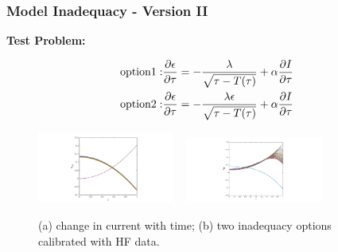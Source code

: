\documentclass[10pt,xcolor=dvipsnames,compress]{beamer}
\begin{document}
\begin{frame}
\frametitle{Model Inadequacy - Version II}
\vfill

\textbf{Test Problem:}

\begin{eqnarray*}
{\rm option 1:} & \frac{\partial\epsilon}{\partial\tau} = -\frac{\lambda}{\sqrt{\tau - {T}(\tau)}} + \alpha \frac{\partial I}{\partial\tau}\\
{\rm option 2:} & \frac{\partial\epsilon}{\partial\tau} = -\frac{\lambda\epsilon}{\sqrt{\tau - {T}(\tau)}} + \alpha \frac{\partial I}{\partial\tau}
\end{eqnarray*}

\begin{figure}[h]
    \centering
    \includegraphics[trim = 9.6in 0.2in 9.6in 0.2in, clip, width=0.4\textwidth]{figs/eta_LF.png} 
    ~
    \includegraphics[trim = 7in 0.2in 7in 0.2in, clip, width=0.4\textwidth]{figs/eta_HF.png}
        \vspace{-3mm}
\caption{(a) change in current with time; (b) two inadequacy options calibrated with HF data.} 
\end{figure}


\vfill
\end{frame}
\end{document}
